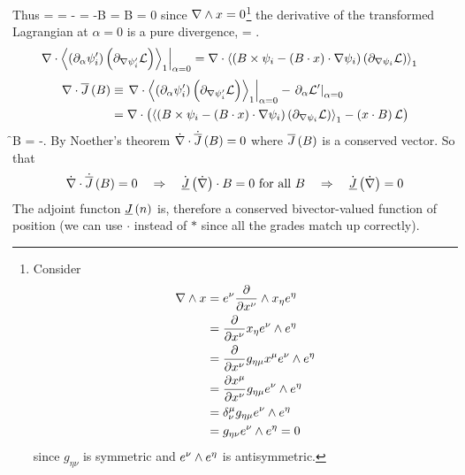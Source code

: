 Thus
\be
	\nabla\cdot{} = \nabla\cdot{} = -\cdot\dot{\nabla} = -B\cdot{}
	                                           = B\cdot{} = 0
\ee
since $\nabla\wedge x = 0$\footnote{Consider
\begin{align*}\nabla\wedge x &= e^{\nu}\displaystyle\frac{\partial{}}{\partial{x^{\nu}}}\wedge x_{\eta}e^{\eta} \\
                         &= \displaystyle\frac{\partial{}}{\partial{x^{\nu}}}x_{\eta}e^{\nu}\wedge e^{\eta} \\
                         &= \displaystyle\frac{\partial{}}{\partial{x^{\nu}}}g_{\eta\mu}x^{\mu}e^{\nu}\wedge e^{\eta} \\
                         &= \displaystyle\frac{\partial{x^{\mu}}}{\partial{x^{\nu}}}g_{\eta\mu}e^{\nu}\wedge e^{\eta} \\
                         &= \delta^{\mu}_{\nu}g_{\eta\mu}e^{\nu}\wedge e^{\eta} \\
                         &= g_{\eta\nu}e^{\nu}\wedge e^{\eta} = 0
\end{align*}
since $g_{\eta\nu}$ is symmetric and $e^{\nu}\wedge e^{\eta} $ is antisymmetric.} the derivative of
the transformed Lagrangian at $\alpha = 0$ is a pure divergence,
\be
	 = \nabla\cdot{}.
\ee
\begin{align}
	\left . {\nabla\cdot\left \langle {\left ({\partial_{\alpha}\psi'_{i}} \right )\left ({\partial_{\nabla\psi'_{i}}\mathcal{L}} \right )} \right \rangle_{1}} \right |_{\alpha=0} &= 
		\nabla\cdot\left \langle {\left ({B\times\psi_{i}-\left ({B\cdot x} \right )\cdot\nabla\psi_{i}} \right )\left ({\partial_{\nabla\psi_{i}}\mathcal{L}} \right )} \right \rangle_{1}
\end{align}
\begin{align}
	\nabla\cdot{\overline{J}}\left ( {B} \right ) &\equiv \left . {\nabla\cdot\left \langle {\left ({\partial_{\alpha}\psi'_{i}} \right )\left ({\partial_{\nabla\psi'_{i}}\mathcal{L}} \right )} \right \rangle_{1}} \right |_{\alpha=0}
	                                  -\left . {\partial_{\alpha}\mathcal{L}'} \right |_{\alpha=0} \nonumber \\
	                               &= \nabla\cdot\left ( {\left \langle {\left ({B\times\psi_{i}-\left ({B\cdot x} \right )\cdot\nabla\psi_{i}} \right )\left ({\partial_{\nabla\psi_{i}}\mathcal{L}} \right )} \right \rangle_{1}-
	                                  \left ( {x\cdot B} \right )\mathcal{L}} \right )
\end{align}
\be\label{eq7_67}
	\f{}{B} = -\Lf.
\ee
By Noether's theorem $\dot{\nabla}\cdot{\dot{\overline{J}}}\left ( {B} \right ) = 0$ where ${\overline{J}}\left ( {B} \right )$ is a conserved vector. So that
\begin{equation*}
	\dot{\nabla}\cdot{\dot{\overline{J}}}\left ( {B} \right ) = 0 \quad \Rightarrow \quad {\dot{\underline{J}}}\left ( {\dot{\nabla}} \right )\cdot B = 0 \mbox{ for all } B 
	\quad\Rightarrow\quad {\dot{\underline{J}}}\left ( {\dot{\nabla}} \right ) = 0
\end{equation*}
The adjoint functon ${\underline{J}}\left ( {n} \right )$ is, therefore a conserved bivector-valued function of position 
(we can use $\cdot$ instead of $*$ since all the grades match up correctly).

